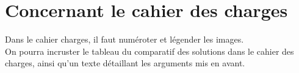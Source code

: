 \documentclass[]{article}
\begin{document}
\section{Concernant le cahier des charges}
Dans le cahier charges, il faut numéroter et légender les images.\\
\indent On pourra incruster le tableau du comparatif des solutions dans le cahier des charges, ainsi qu'un texte détaillant les arguments mis en avant.\\
\end{document}
